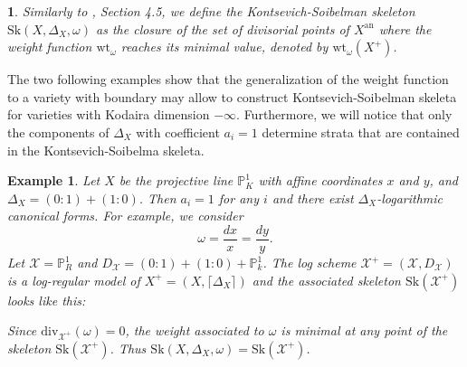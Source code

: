 \documentclass{amsart}%
\numberwithin{equation}{subsection}
\theoremstyle{plain2}
\theoremstyle{definition2}
\newtheorem{example}[equation]{Example}
\theoremstyle{stepstyle}
\theoremstyle{point}
\theoremstyle{subpoint}
\newtheorem{subpoint}[equation]{}%
\newcommand{\spa}[1]{\begin{subpoint}#1\end{subpoint}}           %
\newcommand{\cX}{\ensuremath{\mathscr{X}}}
\newcommand{\divisor}{\mathrm{div}}
\newcommand{\weight}{\mathrm{wt}}
\newcommand{\Sk}{\mathrm{Sk}}
\begin{document}
\spa{Similarly to \cite{MustataNicaise}, Section 4.5, we define the Kontsevich-Soibelman skeleton $\Sk(X, \Delta_X, \omega)$ as the closure of the set of divisorial points of $X^\text{an}$ where the weight function $\weight_\omega$ reaches its minimal value, denoted by $\weight_{\omega}(X^+)$.}

The two following examples show that the generalization of the weight function to a variety with boundary may allow to construct Kontsevich-Soibelman skeleta for varieties with Kodaira dimension $-\infty$. Furthermore, we will notice that  only the components of $\Delta_X$ with coefficient $a_i=1$ determine strata that are contained in the Kontsevich-Soibelma skeleta.

\begin{example}
Let $X$ be the projective line $\mathbb{P}^1_K$ with affine coordinates $x$ and $y$, and $\Delta_X=(0:1) + (1:0)$. Then $a_i=1$ for any $i$ and there exist $\Delta_X$-logarithmic canonical forms. For example, we consider $$\omega =  \frac{dx}{x}= \frac{dy}{y}.$$ Let $\cX= \mathbb{P}_R^1$ and $D_\cX= (0:1) + (1:0)+ \mathbb{P}^1_k$. The log scheme $\cX^+=(\cX,D_\cX)$ is a log-regular model of $X^+=(X,\lceil \Delta_X \rceil)$ and the associated skeleton $\Sk(\cX^+)$ looks like this:
\begin{center}
\end{center}
Since $\divisor_{\cX^+}(\omega)= 0$, the weight associated to $\omega$ is minimal at any point of the skeleton $\Sk(\cX^+)$. Thus $\Sk(X,\Delta_X,\omega)=\Sk(\cX^+)$.
\end{example}
\end{document}

